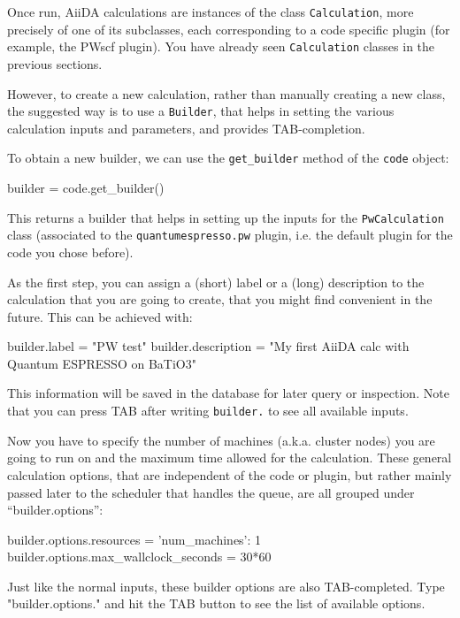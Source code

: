 Once run, AiiDA calculations are instances of the class \texttt{Calculation}, more precisely of one of its subclasses, each corresponding to a code specific plugin (for example, the PWscf plugin). You have already seen \texttt{Calculation} classes in the previous sections.

However, to create a new calculation, rather than manually creating a new class, 
the suggested way is to use a \texttt{Builder}, that helps in setting the various
calculation inputs and parameters, and provides TAB-completion.

To obtain a new builder, we can use the \texttt{get\_builder} method of the \texttt{code} object:
\begin{pythoncommand}
 builder = code.get_builder()
\end{pythoncommand}
This returns a builder that helps in setting up the inputs for the \texttt{PwCalculation} class (associated to the \texttt{quantumespresso.pw} plugin, i.e. the default 
plugin for the code you chose before).

As the first step, you can assign a (short) label or a (long) description
to the calculation that you are going to create, that you might find 
convenient in the future. This can be achieved with:
\begin{pythoncommand}
 builder.label = "PW test"
 builder.description = "My first AiiDA calc with Quantum ESPRESSO on BaTiO3"
\end{pythoncommand}
This information will be saved in the database for later query or inspection.
Note that you can press TAB after writing \texttt{builder.} to see all available inputs.

Now you have to specify the number of machines (a.k.a. cluster nodes) you are going to run on and the maximum time allowed for the calculation. These general calculation options,
that are independent of the code or plugin, but rather mainly passed later to the scheduler
that handles the queue, are all grouped under ``builder.options'':
\begin{pythoncommand}
 builder.options.resources = {'num_machines': 1}
 builder.options.max_wallclock_seconds = 30*60
\end{pythoncommand}
Just like the normal inputs, these builder options are also TAB-completed.
Type "builder.options." and hit the TAB button to see the list of available options.

